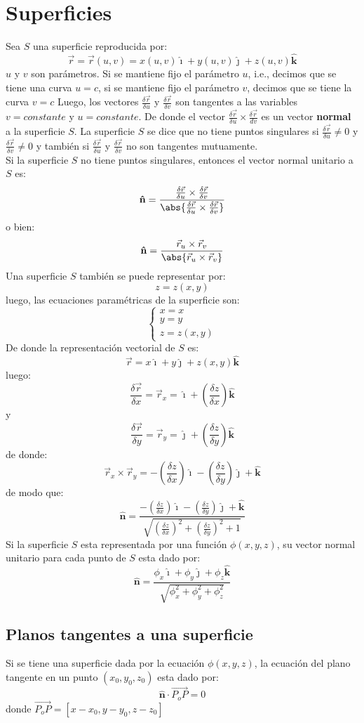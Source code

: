 \documentclass[a4paper]{article}
\newcommand{\ihat}{\boldsymbol{\hat{\imath}}}
\newcommand{\jhat}{\boldsymbol{\hat{\jmath}}}
\newcommand{\khat}{\boldsymbol{\hat{\bm{k}}}}
\begin{document}
\section{Superficies}
Sea $S$ una superficie reproducida por:
\[\vec{r}=\vec{r}(u,v)=x(u,v)\ihat+y(u,v)\jhat+z(u,v)\khat\]
$u$ y $v$ son parámetros.
Si se mantiene fijo el parámetro $u$, i.e., decimos que se tiene una curva $u=c$,
 si se mantiene fijo el parámetro $v$, decimos que se tiene la curva $v=c$
Luego, los vectores $\frac{\delta\vec{r}}{\delta u}$ y $\frac{\delta\vec{r}}{\delta v}$ son tangentes
a las variables $v=constante$ y $u=constante$.
De donde el vector $\frac{\delta\vec{r}}{\delta u}\times\frac{\delta\vec{r}}{dv}$ es un vector \textbf{normal} a la superficie $S$. La superficie $S$ se dice que no tiene puntos singulares si $\frac{\delta\vec{r}}{\delta u}\neq 0$ y $\frac{\delta\vec{r}}{\delta v}\neq 0$ y también si
$\frac{\delta\vec{r}}{\delta u}$ y $\frac{\delta\vec{r}}{\delta v}$ no son tangentes mutuamente.\\
Si la superficie $S$ no tiene puntos singulares, entonces el vector normal unitario
a $S$ es:
\[\mathbf{\hat{n}}=\frac{\frac{\delta\vec{r}}{\delta u}\times\frac{\delta\vec{r}}{\delta v}}{\abs{\frac{\delta\vec{r}}{\delta u}\times\frac{\delta\vec{r}}{\delta v}}}\]
o bien:
\[
\mathbf{\hat{n}}=\frac{\vec{r}_u\times\vec{r}_v}{\abs{\vec{r}_u\times\vec{r}_v}}
\]
Una superficie $S$ también se puede representar por:
\[z=z(x,y)\]
luego, las ecuaciones paramétricas de la superficie son:
\[\begin{cases}
x=x\\
y=y\\
z=z(x,y)
\end{cases}\] 
De donde la representación vectorial de $S$ es:
\[\vec{r}=x\ihat+y\jhat+z(x,y)\khat\]
luego:
\[\frac{\delta\vec{r}}{\delta x}=\vec{r}_x=\ihat+(\frac{\delta z}{\delta x})\khat\]
y
\[\frac{\delta\vec{r}}{\delta y}=\vec{r}_y=\jhat+(\frac{\delta z}{\delta y})\khat\]
de donde:
\[\vec{r}_x\times\vec{r}_y=-(\frac{\delta z}{\delta x})\ihat-(\frac{\delta z}{\delta y})\jhat+\khat\]
de modo que:
\[\mathbf{\hat{n}}=\frac{-(\frac{\delta z}{\delta x})\ihat-(\frac{\delta z}{\delta y})\jhat+\khat}{\sqrt{(\frac{\delta z}{\delta x})^2+(\frac{\delta z}{\delta y})^2+1}}\]
Si la superficie $S$ esta representada por una función $\phi(x,y,z)$, su vector normal unitario para cada punto de $S$ esta dado por:
\[\mathbf{\hat{n}}=\frac{\phi_x\ihat+\phi_y\jhat+\phi_z\khat}{\sqrt{\phi_x^2+\phi_y^2+\phi_z^2}}\]
\subsection{Planos tangentes a una superficie}
Si se tiene una superficie dada por la ecuación $\phi(x,y,z)$, la ecuación del plano tangente en un punto $(x_0,y_0,z_0)$ esta dado por:
\[\mathbf{\hat{n}}\cdot\overrightarrow{P_oP}=0\]
donde $\overrightarrow{P_oP}=[x-x_0,y-y_0,z-z_0]$ 
\end{document}
